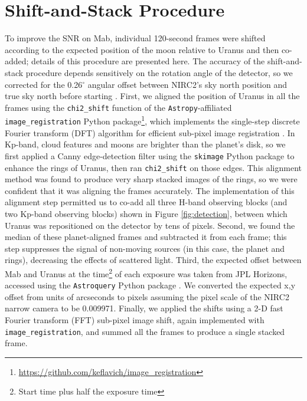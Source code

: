 \documentclass[preprint]{aastex631}
\begin{document}

\appendix

\setcounter{table}{0}
\renewcommand{\thetable}{A\arabic{table}}
\setcounter{figure}{0}
\renewcommand{\thefigure}{A\arabic{figure}}

\section{Shift-and-Stack Procedure}
\label{s:shiftandstack}

To improve the SNR on Mab, individual 120-second frames were shifted according to the expected position of the moon relative to Uranus and then co-added; details of this procedure are presented here. The accuracy of the shift-and-stack procedure depends sensitively on the rotation angle of the detector, so we corrected for the 0.26$^\circ$ angular offset between NIRC2's sky north position and true sky north before starting \citep{service16}. First, we aligned the position of Uranus in all the frames using the \texttt{chi2\_shift} function of the \texttt{Astropy}-affiliated \texttt{image\_registration} Python package\footnote{\url{https://github.com/keflavich/image_registration}}, which implements the single-step discrete Fourier transform (DFT) algorithm for efficient sub-pixel image registration \citep{guizarsicairos08}. In Kp-band, cloud features and moons are brighter than the planet's disk, so we first applied a Canny edge-detection filter using the \texttt{skimage} Python package \citep{skimage14} to enhance the rings of Uranus, then ran \texttt{chi2\_shift} on those edges. This alignment method was found to produce very sharp stacked images of the rings, so we were confident that it was aligning the frames accurately. The implementation of this alignment step permitted us to co-add all three H-band observing blocks (and two Kp-band observing blocks) shown in Figure \ref{fig:detection}, between which Uranus was repositioned on the detector by tens of pixels.  Second, we found the median of these planet-aligned frames and subtracted it from each frame; this step suppresses the signal of non-moving sources (in this case, the planet and rings), decreasing the effects of scattered light. Third, the expected offset between Mab and Uranus at the time\footnote{Start time plus half the exposure time} of each exposure was taken from JPL Horizons, accessed using the \texttt{Astroquery} Python package \citep{ginsburg19}. We converted the expected x,y offset from units of arcseconds to pixels assuming the pixel scale of the NIRC2 narrow camera to be 0.009971\arcsec \citep{service16}. Finally, we applied the shifts using a 2-D fast Fourier transform (FFT) sub-pixel image shift, again implemented with \texttt{image\_registration}, and summed all the frames to produce a single stacked frame.
\end{document}
